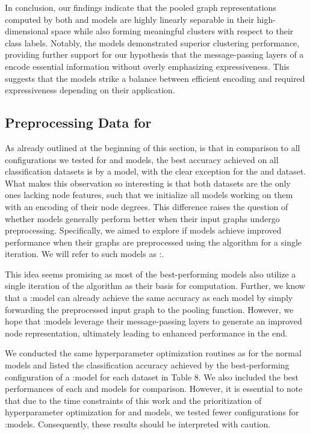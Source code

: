 In conclusion, our findings indicate that the pooled graph representations computed by both \wlnn and \gnn models are highly linearly separable in their high-dimensional space while also forming meaningful clusters with respect to their class labels. Notably, the \gnn models demonstrated superior clustering performance, providing further support for our hypothesis that the message-passing layers of a \gnn encode essential information without overly emphasizing expressiveness. This suggests that the \gnn models strike a balance between efficient encoding and required expressiveness depending on their application.


\FloatBarrier
\subsection{Preprocessing Data for \gnns}
As already outlined at the beginning of this section, is that in comparison to all configurations we tested for \wlnn and \gnn models, the best accuracy achieved on all classification datasets is by a \wlnn model, with the clear exception for the \imdb and \reddit dataset. What makes this observation so interesting is that both datasets are the only ones lacking node features, such that we initialize all \gnn models working on them with an encoding of their node degrees. This difference raises the question of whether \gnn models generally perform better when their input graphs undergo preprocessing. Specifically, we aimed to explore if \gnn models achieve improved performance when their graphs are preprocessed using the \wl algorithm for a single iteration. We will refer to such \gnn models as \wl:\gnn.

This idea seems promising as most of the best-performing \wlnn models also utilize a single iteration of the \wl algorithm as their basis for computation. Further, we know that a \wl:\gnn model can already achieve the same accuracy as each \wlnn model by simply forwarding the preprocessed input graph to the pooling function. However, we hope that \wl:\gnn models leverage their message-passing layers to generate an improved node representation, ultimately leading to enhanced performance in the end.

We conducted the same hyperparameter optimization routines as for the normal \gnn models and listed the classification accuracy achieved by the best-performing configuration of a \wl:\gnn model for each dataset in Table 8. We also included the best performances of each \wlnn and \gnn models for comparison. However, it is essential to note that due to the time constraints of this work and the prioritization of hyperparameter optimization for \gnn and \wlnn models, we tested fewer configurations for \wl:\gnn models. Consequently, these results should be interpreted with caution.

